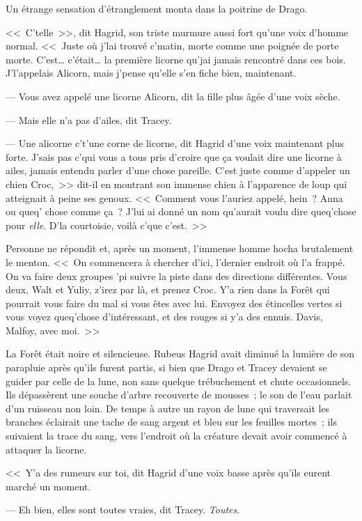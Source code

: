 Un étrange sensation d'étranglement monta dans la poitrine de Drago.

<<~C'telle~>>, dit Hagrid, son triste murmure aussi fort qu'une voix d'homme normal. <<~Juste où j'lai trouvé c'matin, morte comme une poignée de porte morte. C'est… c'était… la première licorne qu'jai jamais rencontré dans ces bois. J'l'appelais Alicorn, mais j'pense qu'elle s'en fiche bien, maintenant.

--- Vous avez appelé une licorne Alicorn, dit la fille plus âgée d'une voix sèche.

--- Mais elle n'a pas d'ailes, dit Tracey.

--- Une alicorne c't'une corne de licorne, dit Hagrid d'une voix maintenant plus forte. J'sais pas c'qui vous a tous pris d'croire que ça voulait dire une licorne à ailes, jamais entendu parler d'une chose pareille. C'est juste comme d'appeler un chien Croc,~>> dit-il en montrant son immense chien à l'apparence de loup qui atteignait à peine ses genoux. <<~Comment vous l'auriez appelé, hein~? Anna ou queq' chose comme ça~? J'lui ai donné un nom qu'aurait voulu dire queq'chose pour \emph{elle}. D'la courtoisie, voilà c'que c'est.~>>

Personne ne répondit et, après un moment, l'immense homme hocha brutalement le menton. <<~On commencera à chercher d'ici, l'dernier endroit où l'a frappé. On va faire deux groupes 'pi suivre la piste dans des directions différentes. Vous deux, Walt et Yuliy, z'irez par là, et prenez Croc. Y'a rien dans la Forêt qui pourrait vous faire du mal si vous êtes avec lui. Envoyez des étincelles vertes si vous voyez queq'chose d'intéressant, et des rouges si y'a des ennuis. Davis, Malfoy, avec moi.~>>

La Forêt était noire et silencieuse. Rubeus Hagrid avait diminué la lumière de son parapluie après qu'ils furent partis, si bien que Drago et Tracey devaient se guider par celle de la lune, non sans quelque trébuchement et chute occasionnels. Ils dépassèrent une souche d'arbre recouverte de mousses~; le son de l'eau parlait d'un ruisseau non loin. De temps à autre un rayon de lune qui traversait les branches éclairait une tache de sang argent et bleu sur les feuilles mortes~; ils suivaient la trace du sang, vers l'endroit où la créature devait avoir commencé à attaquer la licorne.

<<~Y'a des rumeurs sur toi, dit Hagrid d'une voix basse après qu'ils eurent marché un moment.

--- Eh bien, elles sont toutes vraies, dit Tracey. \emph{Toutes}.

